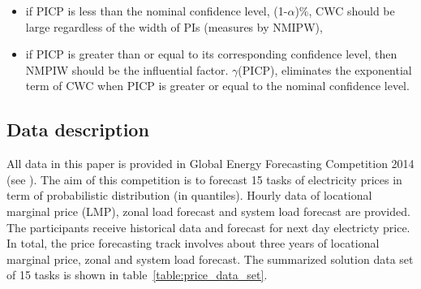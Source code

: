 \documentclass[review]{elsarticle}
\begin{document}
    \begin{itemize}
      \item if PICP is less than the nominal confidence level, (1-$\alpha$)$\%$, CWC should be large regardless of the width of PIs (measures by NMIPW),
      \item if PICP is greater than or equal to its corresponding confidence level, then NMPIW should be the influential factor. $\gamma$(PICP), eliminates the exponential term of CWC when PICP is greater or equal to the nominal confidence level.
    \end{itemize}

  \subsection{Data description}
    All data in this paper is provided in Global Energy Forecasting Competition 2014 (see \cite{Hong2016}). The aim of this competition is to forecast 15 tasks of electricity prices in term of probabilistic distribution (in quantiles). Hourly data of locational marginal price (LMP), zonal load forecast and system load forecast are provided. The participants receive historical data and forecast for next day electricty price. In total, the price forecasting track involves about three years of locational marginal price, zonal and system load forecast. The summarized solution data set of 15 tasks is shown in table~\ref{table:price_data_set}.
\end{document}
